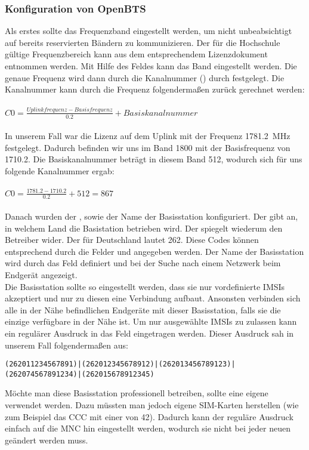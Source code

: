 \subsubsection{Konfiguration von OpenBTS}
Als erstes sollte das Frequenzband eingestellt werden, um nicht unbeabsichtigt auf bereits reservierten Bändern zu kommunizieren.  Der für die Hochschule gültige Frequenzbereich kann aus dem entsprechendem Lizenzdokument entnommen werden. Mit Hilfe des Feldes  kann das Band eingestellt werden. Die genaue Frequenz wird dann durch die Kanalnummer (\ARFCN) durch  festgelegt. Die Kanalnummer kann durch die Frequenz folgendermaßen zurück gerechnet werden:\\ \\
$ C0 = \frac{Uplinkfrequenz - Basisfrequenz}{0.2} + Basiskanalnummer $ \\ \\
In unserem Fall war die Lizenz auf dem Uplink mit der Frequenz \SI{1781.2}{\mega\hertz} festgelegt. Dadurch befinden wir uns im Band 1800 mit der Basisfrequenz von 1710.2. Die Basiskanalnummer beträgt in diesem Band 512, wodurch sich für uns folgende Kanalnummer ergab:\\ \\
$ C0 = \frac{1781.2 - 1710.2}{0.2} + 512 = 867 $ \\ \\
Danach wurden der \MCC, \MNC sowie der Name der Basisstation konfiguriert. Der \MCC gibt an, in welchem Land die Basistation betrieben wird. Der \MNC spiegelt wiederum den Betreiber wider. Der \MCC für Deutschland lautet 262. Diese Codes können entsprechend durch die Felder  und  angegeben werden. Der Name der Basisstation wird durch das Feld  definiert und bei der Suche nach einem Netzwerk beim Endgerät angezeigt. \\
Die Basisstation sollte so eingestellt werden, dass sie nur vordefinierte \acp{IMSI} akzeptiert und nur zu diesen eine Verbindung aufbaut. Ansonsten verbinden sich alle in der Nähe befindlichen Endgeräte mit dieser Basisstation, falls sie die einzige verfügbare in der Nähe ist. Um nur ausgewählte \acp{IMSI} zu zulassen kann ein regulärer Ausdruck in das Feld  eingetragen werden. Dieser Ausdruck sah in unserem Fall folgendermaßen aus: \\
\begin{lstlisting}
(262011234567891)|(262012345678912)|(262013456789123)|
(262074567891234)|(262015678912345)
\end{lstlisting}
Möchte man diese Basisstation professionell betreiben, sollte eine eigene \MNC verwendet werden. Dazu müssten man jedoch eigene SIM-Karten herstellen (wie zum Beispiel das CCC mit einer \MNC von 42). Dadurch kann der reguläre Ausdruck einfach auf die MNC hin eingestellt werden, wodurch sie nicht bei jeder neuen \IMSI geändert werden muss.


